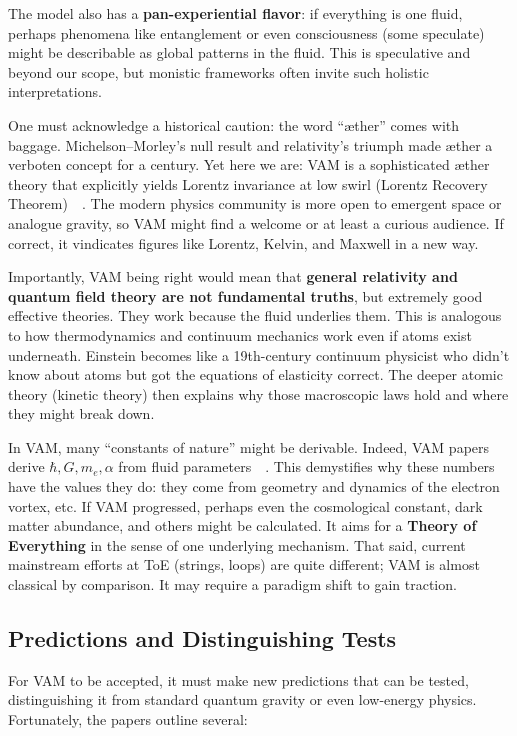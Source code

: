 \documentclass[preprint]{revtex4-2}
\begin{document}
    The model also has a \textbf{pan-experiential flavor}: if everything is one fluid, perhaps phenomena like entanglement or even consciousness (some speculate) might be describable as global patterns in the fluid. This is speculative and beyond our scope, but monistic frameworks often invite such holistic interpretations.

    One must acknowledge a historical caution: the word “æther” comes with baggage. Michelson–Morley’s null result and relativity’s triumph made æther a verboten concept for a century. Yet here we are: VAM is a sophisticated æther theory that explicitly yields Lorentz invariance at low swirl (Lorentz Recovery Theorem)~\cite{reference_236}~\cite{reference_237}. The modern physics community is more open to emergent space or analogue gravity, so VAM might find a welcome or at least a curious audience. If correct, it vindicates figures like Lorentz, Kelvin, and Maxwell in a new way.

    Importantly, VAM being right would mean that \textbf{general relativity and quantum field theory are not fundamental truths}, but extremely good effective theories. They work because the fluid underlies them. This is analogous to how thermodynamics and continuum mechanics work even if atoms exist underneath. Einstein becomes like a 19th-century continuum physicist who didn’t know about atoms but got the equations of elasticity correct. The deeper atomic theory (kinetic theory) then explains why those macroscopic laws hold and where they might break down.

    In VAM, many “constants of nature” might be derivable. Indeed, VAM papers derive $\hbar, G, m_e, \alpha$ from fluid parameters~\cite{reference_238}~\cite{reference_239}. This demystifies why these numbers have the values they do: they come from geometry and dynamics of the electron vortex, etc. If VAM progressed, perhaps even the cosmological constant, dark matter abundance, and others might be calculated. It aims for a \textbf{Theory of Everything} in the sense of one underlying mechanism. That said, current mainstream efforts at ToE (strings, loops) are quite different; VAM is almost classical by comparison. It may require a paradigm shift to gain traction.

    \subsection{Predictions and Distinguishing Tests}
    For VAM to be accepted, it must make new predictions that can be tested, distinguishing it from standard quantum gravity or even low-energy physics. Fortunately, the papers outline several:
\end{document}
